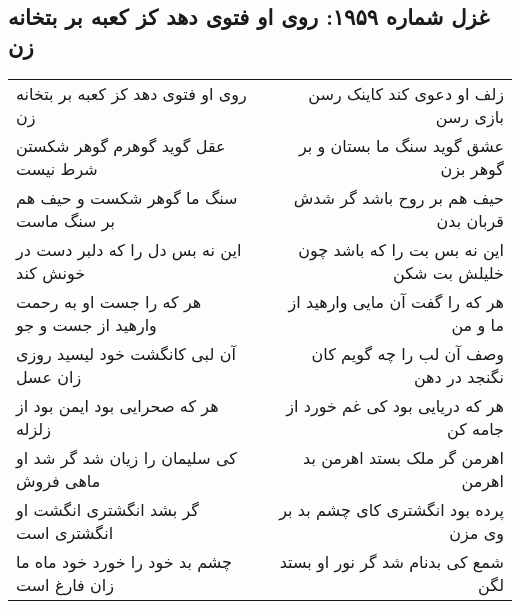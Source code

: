 \begin{center}
\section*{غزل شماره ۱۹۵۹: روی او فتوی دهد کز کعبه بر بتخانه زن}
\label{sec:1959}
\begin{longtable}{l p{0.5cm} r}
روی او فتوی دهد کز کعبه بر بتخانه زن
&&
زلف او دعوی کند کاینک رسن بازی رسن
\\
عقل گوید گوهرم گوهر شکستن شرط نیست
&&
عشق گوید سنگ ما بستان و بر گوهر بزن
\\
سنگ ما گوهر شکست و حیف هم بر سنگ ماست
&&
حیف هم بر روح باشد گر شدش قربان بدن
\\
این نه بس دل را که دلبر دست در خونش کند
&&
این نه بس بت را که باشد چون خلیلش بت شکن
\\
هر که را جست او به رحمت وارهید از جست و جو
&&
هر که را گفت آن مایی وارهید از ما و من
\\
آن لبی کانگشت خود لیسید روزی زان عسل
&&
وصف آن لب را چه گویم کان نگنجد در دهن
\\
هر که صحرایی بود ایمن بود از زلزله
&&
هر که دریایی بود کی غم خورد از جامه کن
\\
کی سلیمان را زیان شد گر شد او ماهی فروش
&&
اهرمن گر ملک بستد اهرمن بد اهرمن
\\
گر بشد انگشتری انگشت او انگشتری است
&&
پرده بود انگشتری کای چشم بد بر وی مزن
\\
چشم بد خود را خورد خود ماه ما زان فارغ است
&&
شمع کی بدنام شد گر نور او بستد لگن
\\
\end{longtable}
\end{center}

